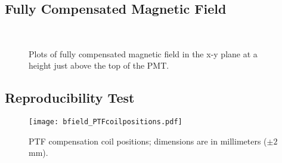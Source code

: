 \subsection{Fully Compensated Magnetic Field}
\label{Appendix:PlotsofFullCompensation}

%
\begin{figure}[htbp]
  \begin{center}
    \\
    \vspace{-3 mm}
  \caption{Plots of fully compensated magnetic field in the x-y plane at a height just above the top of the PMT.}
  \label{fig:bfield_fullcomp}
  \end{center}
\end{figure}
%

\subsection{Reproducibility Test}
\label{Appendix:ReproducibilityTest}

%
\begin{figure}[H]
  \begin{center}
  \texttt{[image: bfield\_PTFcoilpositions.pdf]}
  \caption{PTF compensation coil positions; dimensions are in millimeters ($\pm2$ mm).}
  \label{fig:coilpos}
  \end{center}
\end{figure}
%

